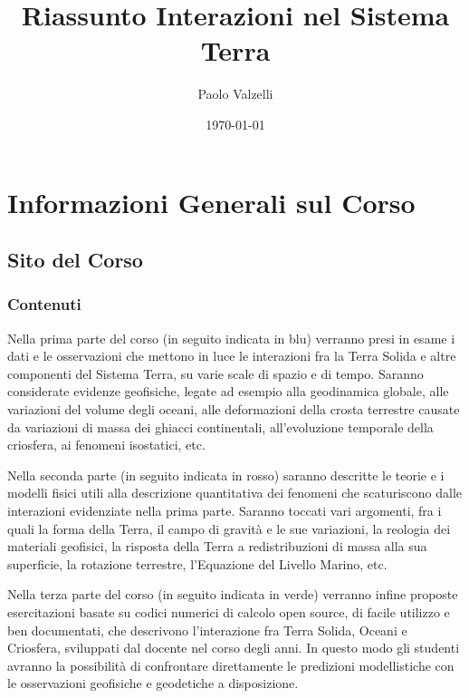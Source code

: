 \documentclass[a4paper,12pt]{book}
\begin{document}
\title{Riassunto Interazioni nel Sistema Terra}
\author{Paolo Valzelli}
\date{\today}
\maketitle

\tableofcontents
\clearpage

\chapter{Informazioni Generali sul Corso}

\section{Sito del Corso}

\subsection{Contenuti}

Nella prima parte del corso (\textcolor{colore2}{in seguito indicata in blu}) verranno presi in esame i dati e le osservazioni che mettono in luce le interazioni fra la Terra Solida e altre componenti del Sistema Terra, su varie scale di spazio e di tempo. 
Saranno considerate evidenze geofisiche, legate ad esempio alla geodinamica globale, alle variazioni del volume degli oceani, alle deformazioni della crosta terrestre causate da variazioni di massa dei ghiacci continentali, all’evoluzione temporale della criosfera, ai fenomeni isostatici, etc.

Nella seconda parte (\textcolor{colore7}{in seguito indicata in rosso}) saranno descritte le teorie e i modelli fisici utili alla descrizione quantitativa dei fenomeni che scaturiscono dalle interazioni evidenziate nella prima parte.
Saranno toccati vari argomenti, fra i quali la forma della Terra, il campo di gravità e le sue variazioni, la reologia dei materiali geofisici, la risposta della Terra a redistribuzioni di massa alla sua superficie, la rotazione terrestre, l’Equazione del Livello Marino, etc.

Nella terza parte del corso (\textcolor{colore4}{in seguito indicata in verde}) verranno infine proposte esercitazioni basate su codici numerici di calcolo open source, di facile utilizzo e ben documentati, che descrivono l’interazione fra Terra Solida, Oceani e Criosfera, sviluppati dal docente nel corso degli anni. 
In questo modo gli studenti avranno la possibilità di confrontare direttamente le predizioni modellistiche con le osservazioni geofisiche e geodetiche a disposizione. 
\end{document}
